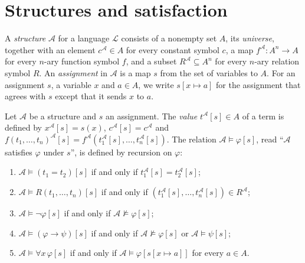 \section{Structures and satisfaction}\label{logic:section-structures}

\begin{definition}\label{logic:definition-structure}
A \emph{structure} $\mathcal{A}$ for a language $\mathcal{L}$ consists of a
nonempty set $A$, its \emph{universe}, together with an element
$c^{\mathcal{A}} \in A$ for every constant symbol $c$, a map
$f^{\mathcal{A}} \colon A^n \to A$ for every $n$-ary function symbol $f$, and a
subset $R^{\mathcal{A}} \subseteq A^n$ for every $n$-ary relation symbol $R$. An
\emph{assignment} in $\mathcal{A}$ is a map $s$ from the set of variables to
$A$. For an assignment $s$, a variable $x$ and $a \in A$, we write
$s[x \mapsto a]$ for the assignment that agrees with $s$ except that it sends
$x$ to $a$.
\end{definition}

\begin{definition}\label{logic:definition-satisfaction}
Let $\mathcal{A}$ be a structure and $s$ an assignment. The \emph{value}
$t^{\mathcal{A}}[s] \in A$ of a term is defined by $x^{\mathcal{A}}[s] = s(x)$,
$c^{\mathcal{A}}[s] = c^{\mathcal{A}}$ and
$f(t_1, \ldots, t_n)^{\mathcal{A}}[s] = f^{\mathcal{A}}(t_1^{\mathcal{A}}[s], \ldots, t_n^{\mathcal{A}}[s])$.
The relation $\mathcal{A} \models \varphi[s]$, read ``$\mathcal{A}$ satisfies
$\varphi$ under $s$'', is defined by recursion on $\varphi$:
\begin{enumerate}
\item $\mathcal{A} \models (t_1 = t_2)[s]$ if and only if
$t_1^{\mathcal{A}}[s] = t_2^{\mathcal{A}}[s]$;
\item $\mathcal{A} \models R(t_1, \ldots, t_n)[s]$ if and only if
$(t_1^{\mathcal{A}}[s], \ldots, t_n^{\mathcal{A}}[s]) \in R^{\mathcal{A}}$;
\item $\mathcal{A} \models \neg\varphi[s]$ if and only if
$\mathcal{A} \not\models \varphi[s]$;
\item $\mathcal{A} \models (\varphi \to \psi)[s]$ if and only if
$\mathcal{A} \not\models \varphi[s]$ or $\mathcal{A} \models \psi[s]$;
\item $\mathcal{A} \models \forall x\,\varphi[s]$ if and only if
$\mathcal{A} \models \varphi[s[x \mapsto a]]$ for every $a \in A$.
\end{enumerate}
\end{definition}

